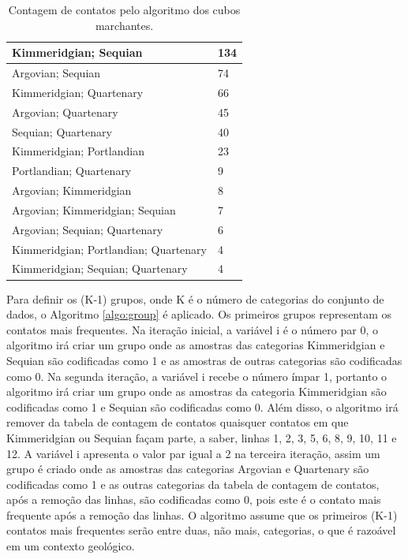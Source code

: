 \begin{table}[H]
\caption{Contagem de contatos pelo algoritmo dos cubos marchantes.} \label{table:contact_count}
\centering
\begin{tabular}{|l|l|}
\hline
Kimmeridgian; Sequian                 & 134 \\ \hline
Argovian; Sequian                     & 74  \\ \hline
Kimmeridgian; Quartenary              & 66  \\ \hline
Argovian; Quartenary                  & 45  \\ \hline
Sequian; Quartenary                   & 40  \\ \hline
Kimmeridgian; Portlandian             & 23  \\ \hline
Portlandian; Quartenary               & 9   \\ \hline
Argovian; Kimmeridgian                & 8   \\ \hline
Argovian; Kimmeridgian; Sequian       & 7   \\ \hline
Argovian; Sequian; Quartenary         & 6   \\ \hline
Kimmeridgian; Portlandian; Quartenary & 4   \\ \hline
Kimmeridgian; Sequian; Quartenary     & 4   \\ \hline
\end{tabular}
\end{table}

Para definir os (K-1) grupos, onde K é o número de categorias do conjunto de dados, o Algoritmo \ref{algo:group} é aplicado. Os primeiros grupos representam os contatos mais frequentes. Na iteração inicial, a variável i é o número par 0, o algoritmo irá criar um grupo onde as amostras das categorias Kimmeridgian e Sequian são codificadas como 1 e as amostras de outras categorias são codificadas como 0. Na segunda iteração, a variável i recebe o número ímpar 1, portanto o algoritmo irá criar um grupo onde as amostras da categoria Kimmeridgian são codificadas como 1 e Sequian são codificadas como 0. Além disso, o algoritmo irá remover da tabela de contagem de contatos quaisquer contatos em que Kimmeridgian ou Sequian façam parte, a saber, linhas 1, 2, 3, 5, 6, 8, 9, 10, 11 e 12. A variável i apresenta o valor par igual a 2 na terceira iteração, assim um grupo é criado onde as amostras das categorias Argovian e Quartenary são codificadas como 1 e as outras categorias da tabela de contagem de contatos, após a remoção das linhas, são codificadas como 0, pois este é o contato mais frequente após a remoção das linhas. O algoritmo assume que os primeiros (K-1) contatos mais frequentes serão entre duas, não mais, categorias, o que é razoável em um contexto geológico.

